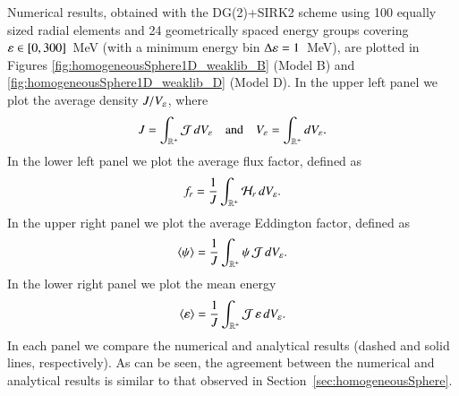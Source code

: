 \documentclass[11pt,letterpaper,twoside,english,final]{article}
\begin{document}
Numerical results, obtained with the DG(2)+SIRK2 scheme using 100 equally sized radial elements and 24 geometrically spaced energy groups covering $\varepsilon\in[0,300]$~MeV (with a minimum energy bin $\Delta\varepsilon=1$~MeV), are plotted in Figures \ref{fig:homogeneousSphere1D_weaklib_B} (Model B) and \ref{fig:homogeneousSphere1D_weaklib_D} (Model D).  
In the upper left panel we plot the average density $J/V_{\varepsilon}$, where
\begin{equation}
  J=\int_{\mathbb{R}^{+}}\mathcal{J}\,dV_{\varepsilon}
  \quad\text{and}\quad
  V_{\varepsilon}=\int_{\mathbb{R}^{+}}dV_{\varepsilon}.  
  \label{eq:averageDensity}
\end{equation}
In the lower left panel we plot the average flux factor, defined as
\begin{equation}
  f_{r}=\frac{1}{J}\int_{\mathbb{R}^{+}}\mathcal{H}_{r}\,dV_{\varepsilon}.  
  \label{eq:averageFluxFactor}
\end{equation}
In the upper right panel we plot the average Eddington factor, defined as
\begin{equation}
  \langle\psi\rangle=\frac{1}{J}\int_{\mathbb{R}^{+}}\psi\,\mathcal{J}\,dV_{\varepsilon}.  
\end{equation}
In the lower right panel we plot the mean energy
\begin{equation}
  \langle\varepsilon\rangle=\frac{1}{J}\int_{\mathbb{R}^{+}}\mathcal{J}\,\varepsilon\,dV_{\varepsilon}.  
  \label{eq:meanEnergy}
\end{equation}
In each panel we compare the numerical and analytical results (dashed and solid lines, respectively).  
As can be seen, the agreement between the numerical and analytical results is similar to that observed in Section~\ref{sec:homogeneousSphere}.  
\end{document}
